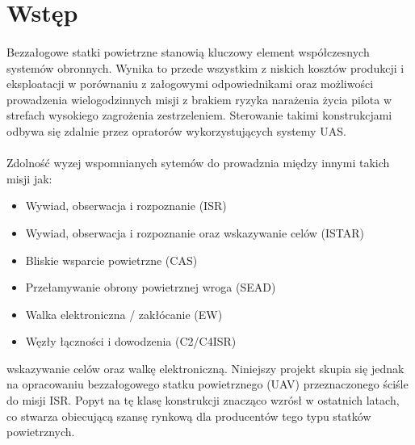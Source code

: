 \section{Wstęp}

    \paragraph{}
        Bezzałogowe statki powietrzne stanowią kluczowy element współczesnych systemów obronnych. 
        Wynika to przede wszystkim z niskich kosztów produkcji i eksploatacji w porównaniu z załogowymi odpowiednikami oraz
        możliwości prowadzenia wielogodzinnych misji z brakiem ryzyka narażenia życia pilota w strefach wysokiego zagrożenia zestrzeleniem.
        Sterowanie takimi konstrukcjami odbywa się zdalnie przez opratorów wykorzystujących systemy UAS.
       
    \paragraph{}

        Zdolność wyzej wspomnianych sytemów do prowadznia między innymi takich misji jak:
        \begin{itemize}
            \item Wywiad, obserwacja i rozpoznanie (ISR)
            \item Wywiad, obserwacja i rozpoznanie oraz wskazywanie celów (ISTAR)
            \item Bliskie wsparcie powietrzne (CAS)
            \item Przełamywanie obrony powietrznej wroga (SEAD)
            \item Walka elektroniczna / zakłócanie (EW)
            \item Węzły łączności i dowodzenia (C2/C4ISR)
        \end{itemize}
        wskazywanie celów oraz walkę elektroniczną.
        Niniejszy projekt skupia się jednak na opracowaniu bezzałogowego statku powietrznego (UAV) przeznaczonego ściśle do misji ISR.
        Popyt na tę klasę konstrukcji znacząco wzrósł w ostatnich latach, 
        co stwarza obiecującą szansę rynkową dla producentów tego typu statków powietrznych.

    \paragraph{}

